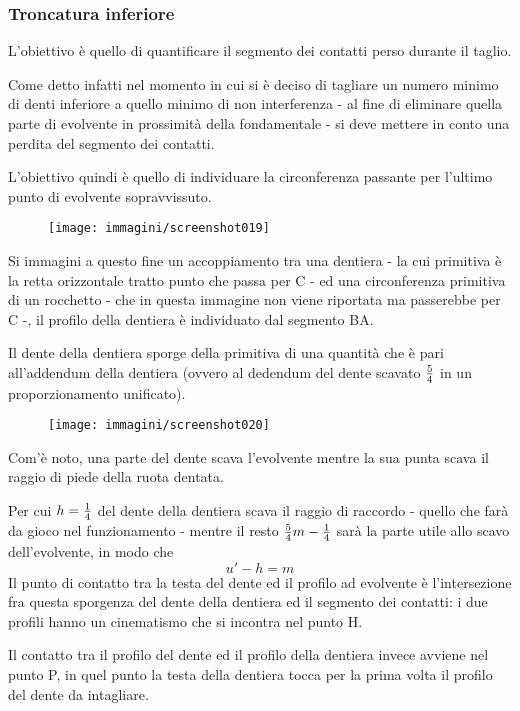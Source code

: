 \documentclass[a4paper, 15pt]{article}
\begin{document}
\subsubsection{Troncatura inferiore}	
\begin{adjustwidth}{2in}{} 	
		L'obiettivo è quello di quantificare il segmento dei contatti perso durante il taglio. 
		
		Come detto infatti nel momento in cui si è deciso di tagliare un numero minimo di denti inferiore a quello minimo di non interferenza - al fine di eliminare quella parte di evolvente in prossimità della fondamentale - si deve mettere in conto una perdita del segmento dei contatti. 
		
		L'obiettivo quindi è quello di individuare la circonferenza passante per l'ultimo punto di evolvente sopravvissuto. 
		\begin{figure}[H]
			\centering
			\texttt{[image: immagini/screenshot019]}
			\label{fig:screenshot019}
		\end{figure}
		Si immagini a questo fine un accoppiamento tra una dentiera - la cui primitiva è la retta orizzontale tratto punto che passa per C - ed una circonferenza primitiva di un rocchetto - che in questa immagine non viene riportata ma passerebbe per C -, il profilo della dentiera è individuato dal segmento BA. 
		
		Il dente della dentiera sporge della primitiva di una quantità che è pari all'addendum della dentiera (ovvero al dedendum del dente scavato $5\over4$ in un proporzionamento unificato). 
\begin{figure}[H]
	\centering
	\label{fig:screenshot020}
	\texttt{[image: immagini/screenshot020]}
\end{figure}		
		Com'è noto, una parte del dente scava l'evolvente mentre la sua punta scava il raggio di piede della ruota dentata.
		
		Per cui $h = {1\over4}$ del dente della dentiera scava il raggio di raccordo - quello che farà da gioco nel funzionamento - mentre il resto ${5\over4}m -{1\over4}$ sarà la parte utile allo scavo dell'evolvente, in modo che 
		\[u'- h = m \]
		Il punto di contatto tra la testa del dente ed il profilo ad evolvente è l'intersezione fra questa sporgenza del dente della dentiera ed il segmento  dei contatti: i due profili hanno un cinematismo che si incontra nel punto H. 
		
		Il contatto tra il profilo del dente ed il profilo della dentiera invece avviene nel punto P, in quel punto la testa della dentiera tocca per la prima volta il profilo del dente da intagliare.
		

\end{adjustwidth}
\end{document}
